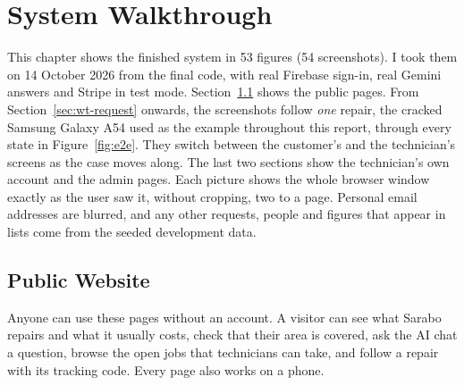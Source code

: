 \documentclass{standalone}
\begin{document}
\chapter{System Walkthrough}
\label{ch:walkthrough}

This chapter shows the finished system in 53 figures (54 screenshots). I took them on 14 October 2026 from the final code, with real Firebase sign-in, real Gemini answers and Stripe in test mode. Section~\ref{sec:wt-public} shows the public pages. From Section~\ref{sec:wt-request} onwards, the screenshots follow \emph{one} repair, the cracked Samsung Galaxy A54 used as the example throughout this report, through every state in Figure~\ref{fig:e2e}. They switch between the customer's and the technician's screens as the case moves along. The last two sections show the technician's own account and the admin pages. Each picture shows the whole browser window exactly as the user saw it, without cropping, two to a page. Personal email addresses are blurred, and any other requests, people and figures that appear in lists come from the seeded development data.

\makeatletter\setlength{\@fptop}{0pt}\setlength{\@fpbot}{0pt plus 1fil}\makeatother

\FloatBarrier
{}
\section{Public Website}\label{sec:wt-public}
Anyone can use these pages without an account. A visitor can see what Sarabo repairs and what it usually costs, check that their area is covered, ask the AI chat a question, browse the open jobs that technicians can take, and follow a repair with its tracking code. Every page also works on a phone.
\end{document}
